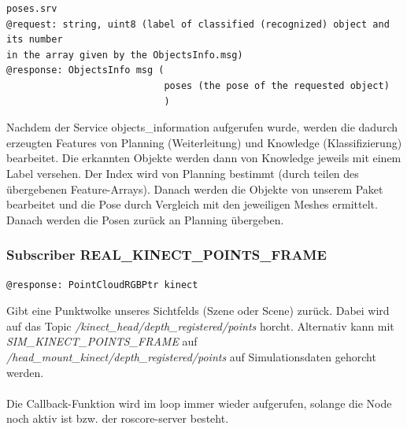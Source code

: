 \documentclass{suturo}
\begin{document}
\begin{figure}[!htb]
\end{figure}


\begin{verbatim}
poses.srv
@request: string, uint8 (label of classified (recognized) object and its number
in the array given by the ObjectsInfo.msg)
@response: ObjectsInfo msg (
							poses (the pose of the requested object)
							)
\end{verbatim}
Nachdem der Service objects\_information aufgerufen wurde, werden die dadurch erzeugten Features von Planning (Weiterleitung) und Knowledge (Klassifizierung) bearbeitet. Die erkannten Objekte werden dann von Knowledge jeweils mit einem Label versehen. Der Index wird von Planning bestimmt (durch teilen des übergebenen Feature-Arrays). Danach werden die Objekte von unserem Paket bearbeitet und die Pose durch Vergleich mit den jeweiligen Meshes ermittelt. Danach werden die Posen zurück an Planning übergeben.

\subsubsection{Subscriber REAL\_KINECT\_POINTS\_FRAME}
\begin{verbatim}
@response: PointCloudRGBPtr kinect
\end{verbatim}
Gibt eine Punktwolke unseres Sichtfelds (Szene oder Scene) zurück. Dabei wird auf das Topic \textit{/kinect\_head/depth\_registered/points} horcht. Alternativ kann mit \textit{SIM\_KINECT\_POINTS\_FRAME} auf \textit{/head\_mount\_kinect/depth\_registered/points} auf Simulationsdaten gehorcht werden.
\\ \\
Die Callback-Funktion wird im loop immer wieder aufgerufen, solange die Node noch aktiv ist bzw. der roscore-server besteht.
\end{document}

